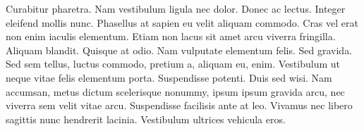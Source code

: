 \remerciements

Curabitur pharetra. Nam vestibulum ligula nec dolor. Donec ac
lectus. Integer eleifend mollis nunc. Phasellus at sapien eu velit
aliquam commodo. Cras vel erat non enim iaculis elementum. Etiam
non lacus sit amet arcu viverra fringilla. Aliquam blandit.
Quisque at odio. Nam vulputate elementum felis. Sed gravida. Sed
sem tellus, luctus commodo, pretium a, aliquam eu, enim.
Vestibulum ut neque vitae felis elementum porta. Suspendisse
potenti. Duis sed wisi. Nam accumsan, metus dictum scelerisque
nonummy, ipsum ipsum gravida arcu, nec viverra sem velit vitae
arcu. Suspendisse facilisis ante at leo. Vivamus nec libero
sagittis nunc hendrerit lacinia. Vestibulum ultrices vehicula
eros.
